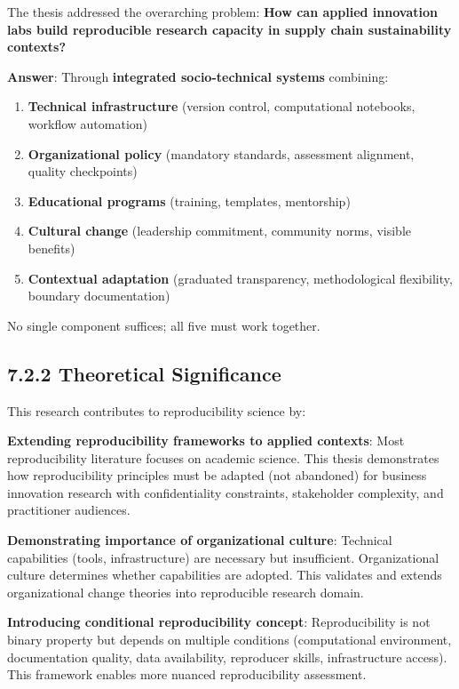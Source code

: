 \documentclass[
  oneside,
  open=any]{scrbook}
\providecommand{\tightlist}{%
  \setlength{\itemsep}{0pt}\setlength{\parskip}{0pt}}\usepackage{longtable,booktabs,array}
\begin{document}
The thesis addressed the overarching problem: \textbf{How can applied
innovation labs build reproducible research capacity in supply chain
sustainability contexts?}

\textbf{Answer}: Through \textbf{integrated socio-technical systems}
combining:

\begin{enumerate}
\def\labelenumi{\arabic{enumi}.}
\tightlist
\item
  \textbf{Technical infrastructure} (version control, computational
  notebooks, workflow automation)
\item
  \textbf{Organizational policy} (mandatory standards, assessment
  alignment, quality checkpoints)
\item
  \textbf{Educational programs} (training, templates, mentorship)
\item
  \textbf{Cultural change} (leadership commitment, community norms,
  visible benefits)
\item
  \textbf{Contextual adaptation} (graduated transparency, methodological
  flexibility, boundary documentation)
\end{enumerate}

No single component suffices; all five must work together.

\subsection{7.2.2 Theoretical
Significance}\label{theoretical-significance}

This research contributes to reproducibility science by:

\textbf{Extending reproducibility frameworks to applied contexts}: Most
reproducibility literature focuses on academic science. This thesis
demonstrates how reproducibility principles must be adapted (not
abandoned) for business innovation research with confidentiality
constraints, stakeholder complexity, and practitioner audiences.

\textbf{Demonstrating importance of organizational culture}: Technical
capabilities (tools, infrastructure) are necessary but insufficient.
Organizational culture determines whether capabilities are adopted. This
validates and extends organizational change theories into reproducible
research domain.

\textbf{Introducing conditional reproducibility concept}:
Reproducibility is not binary property but depends on multiple
conditions (computational environment, documentation quality, data
availability, reproducer skills, infrastructure access). This framework
enables more nuanced reproducibility assessment.
\end{document}
